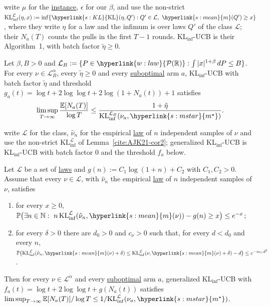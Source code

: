 \documentclass[11pt]{article}
\newcommand{\E}{\mathbb{E}}
\newcommand{\Prob}{\mathbb{P}}
\newcommand{\Pspace}{\term{w:law}{\mathcal{P}(\mathbb{R})}}
\newcommand{\sy}[2]{{\hyperlink{#1}{#2}}}
\newcommand{\term}[2]{\hyperlink{#1}{#2}}
\newcommand{\mean}{\sy{s:mean}{m}}
\newcommand{\KL}{\sy{s:KL}{\mathrm{KL}}}
\newcommand{\mstar}{\sy{s:mstar}{m^{\star}}}
\begin{document}
\citet{AJK21} write $\mu$ for the \term{w:instance}{instance}, $\epsilon$ for our $\beta$, and use the non-strict
$\mathrm{KL}_{\inf}^{\mathcal L}(\eta,x):=\inf\{\KL(\eta,Q'):Q'\in\mathcal L,\ \mean(Q')\ge x\}$, where they write
$\eta$ for a law and the infimum is over laws $Q'$ of the class $\mathcal L$; their
$N_a(T)$ counts the pulls in the first $T-1$ rounds. KL$_{\inf}$-UCB is their Algorithm~1, with batch factor
$\tilde\eta\ge0$.

\begin{lemma}\label{cite:AJK21-cor2}
Let $\beta,B>0$ and $\mathcal L_B:=\{P\in\Pspace:\int|x|^{1+\beta}\,dP\le B\}$. For every $\nu\in\mathcal L_B^\alpha$, every
$\tilde\eta\ge0$ and every \term{w:subopt}{suboptimal} arm $a$, KL$_{\inf}$-UCB with batch factor $\tilde\eta$ and threshold
$g_a(t)=\log t+2\log\log t+2\log(1+N_a(t))+1$ satisfies
\begin{equation*}
  \limsup_{T\to\infty}\frac{\E[N_a(T)]}{\log T}\le\frac{1+\tilde\eta}{\mathrm{KL}_{\inf}^{\mathcal L_B}(\nu_a,\mstar)}.
\end{equation*}
\end{lemma}

\citet{PA26} write $\mathcal L$ for the class, $\hat\nu_n$ for the empirical \term{w:law}{law} of $n$ independent samples of
$\nu$ and use the non-strict $\mathrm{KL}_{\inf}^{\mathcal L}$ of Lemma~\ref{cite:AJK21-cor2}; generalized KL$_{\inf}$-UCB is
KL$_{\inf}$-UCB with batch factor $0$ and the threshold $f_a$ below.

\begin{lemma}\label{cite:PA26-thm3.1}
Let $\mathcal L$ be a set of \term{w:law}{laws} and $g(n):=C_1\log(1+n)+C_2$ with $C_1,C_2>0$. Assume that every
$\nu\in\mathcal L$, with $\hat\nu_n$ the empirical \term{w:law}{law} of $n$ independent samples of $\nu$, satisfies
\begin{enumerate}[label=(\alph*)]
  \item for every $x\ge0$, $\Prob\bigl(\exists n\in\mathbb N:\ n\,\mathrm{KL}_{\inf}^{\mathcal L}(\hat\nu_n,\mean(\nu))-g(n)\ge x\bigr)\le e^{-x}$;
  \item for every $\delta>0$ there are $d_0>0$ and $c_\nu>0$ such that, for every $d<d_0$ and every $n$,
  $\Prob\bigl(\mathrm{KL}_{\inf}^{\mathcal L}(\hat\nu_n,\mean(\nu)+\delta)\le\mathrm{KL}_{\inf}^{\mathcal L}(\nu,\mean(\nu)+\delta)-d\bigr)\le e^{-nc_\nu d^2}$.
\end{enumerate}
Then for every $\nu\in\mathcal L^\alpha$ and every \term{w:subopt}{suboptimal} arm $a$, generalized KL$_{\inf}$-UCB with
$f_a(t)=\log t+2\log\log t+g(N_a(t))$ satisfies
$\limsup_{T\to\infty}\E[N_a(T)]/\log T\le1/\mathrm{KL}_{\inf}^{\mathcal L}(\nu_a,\mstar)$.
\end{lemma}
\end{document}
